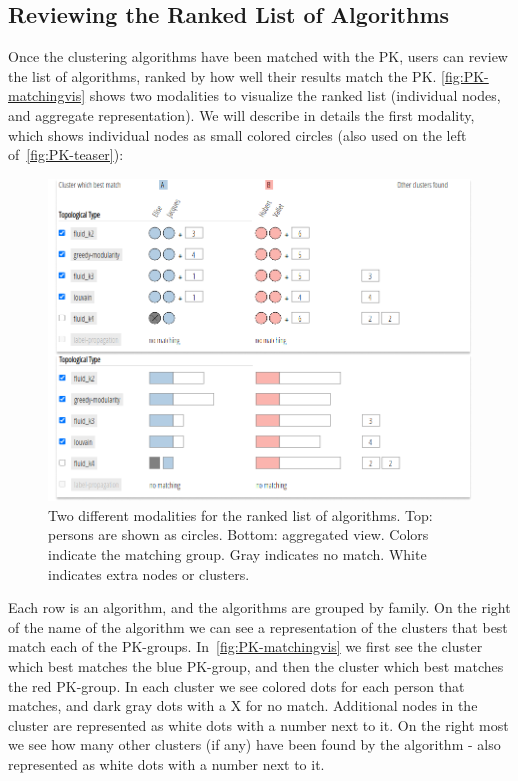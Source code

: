 \subsection{Reviewing the Ranked List of Algorithms}


Once the clustering algorithms have been matched with the PK, users can review the list of algorithms, ranked by how well their results match the PK.
\autoref{fig:PK-matchingvis} shows two modalities to visualize the ranked list (individual nodes, and aggregate representation). We will describe in details the first modality, which shows individual nodes as small colored circles (also used on the left of~\autoref{fig:PK-teaser}):


\begin{figure}%
\centering
\includegraphics[width=\linewidth]{static/figures/PK-Clustering/VISPaperFigures/matchingExampleFinal.png}
\caption{Two different modalities for the ranked list of algorithms. Top: persons are shown as circles. Bottom: aggregated view. Colors indicate the matching group. Gray indicates no match. White indicates extra nodes or clusters.}
\label{fig:PK-matchingvis}
\end{figure}


Each row is an algorithm, and the algorithms are grouped by family. On the right of the name of the algorithm we can see a representation of the clusters that best match each of the PK-groups. In~\autoref{fig:PK-matchingvis} we first see the cluster which best matches the blue PK-group, and then the cluster which best matches the red PK-group.  In each cluster we see colored dots for each person that matches, and dark gray dots with a X for no match. Additional nodes in the cluster are represented as white dots with a number next to it.  On the right most we see how many other clusters (if any) have been found by the algorithm - also represented as white dots with a number next to it.


